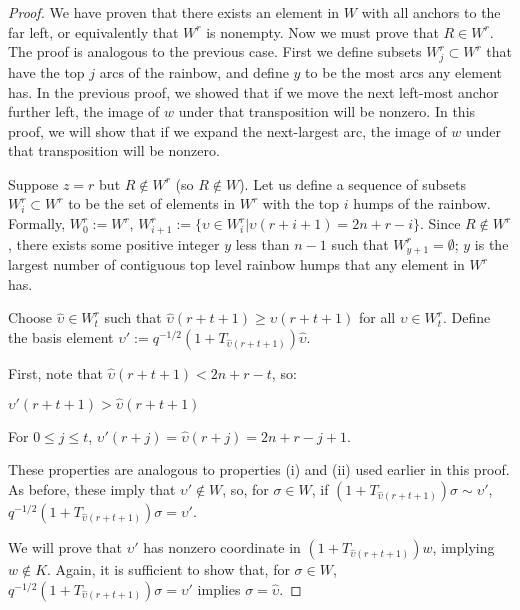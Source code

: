\documentclass{amsart}
\begin{document}
\begin{proof}
	\vspace{1mm}
	We have proven that there exists an element in $W$ with all anchors to the far left, or equivalently that $W^r$ is nonempty. Now we must prove that $R\in W^r$. The proof is analogous to the previous case. First we define subsets $W^r_j\subset W^r$ that have the top $j$ arcs of the rainbow, and define $y$ to be the most arcs any element has. In the previous proof, we showed that if we move the next left-most anchor further left, the image of $w$ under that transposition will be nonzero. In this proof, we will show that if we expand the next-largest arc, the image of $w$ under that transposition will be nonzero.
	
	\vspace{1mm}
	Suppose $z=r$ but $R\not\in W^r$ (so $R\not\in W$). Let us define a sequence of subsets $W^r_i\subset W^r$ to be the set of elements in $W^r$ with the top $i$ humps of the rainbow. Formally, $W^r_0:=W^r$, $W^r_{i+1}:=\{\upsilon\in W^r_i| \upsilon(r+i+1)=2n+r-i \}$. Since $R\not\in W^r$,  there exists some positive integer $y$ less than $n-1$ such that $W^r_{y+1}=\emptyset$; $y$ is the largest number of contiguous top level rainbow humps that any element in $W^r$ has. 
	
	
	Choose $\widehat{\upsilon}\in W^r_t$ such that $\widehat{\upsilon}(r+t+1)\geq \upsilon(r+t+1)$ for all $\upsilon\in W^r_t$. Define the basis element $\upsilon':=q^{-1/2}(1+T_{\widehat{\upsilon}(r+t+1)})\widehat{\upsilon}$. 
	
	First, note that $\widehat{\upsilon}(r+t+1)<2n+r-t$, so:
	\begin{enumerate}[label={[\roman*]}]
		\item $\upsilon'(r+t+1)>\widehat{\upsilon}(r+t+1)$ 
		\item For $0\leq j\leq t$, $\upsilon'(r+j)=\widehat{\upsilon}(r+j)=2n+r-j+1$.
	\end{enumerate}
	
	These properties are analogous to properties (i) and (ii) used earlier in this proof. As before, these imply that $\upsilon'\not\in W$, so, for $\sigma\in W$, if $(1+T_{\widehat{\upsilon}(r+t+1)})\sigma\sim \upsilon'$, $q^{-1/2}(1+T_{\widehat{\upsilon}(r+t+1)})\sigma=\upsilon'$.
	
	We will prove that $\upsilon'$ has nonzero coordinate in $(1+T_{\widehat{\upsilon}(r+t+1)})w$, implying $w\not\in K$. Again, it is sufficient to show that, for $\sigma\in W$, $q^{-1/2}(1+T_{\widehat{\upsilon}(r+t+1)})\sigma=\upsilon'$ implies $\sigma=\widehat{\upsilon}$.
	

\end{proof}
\end{document}
